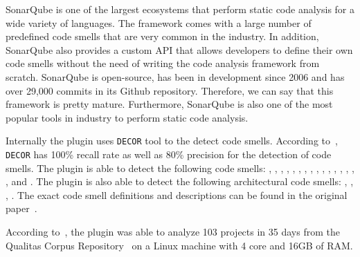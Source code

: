 SonarQube is one of the largest ecosystems that perform static code analysis for a wide variety of languages.
The framework comes with a large number of predefined code smells that are very common in the industry.
In addition, SonarQube also provides a custom API that allows developers to define their own code smells without
the need of writing the code analysis framework from scratch.
SonarQube is open-source, has been in development since 2006 and has over 29,000 commits in its Github repository\cite{sonar-repo}.
Therefore, we can say that this framework is pretty mature.
Furthermore, SonarQube is also one of the most popular tools in industry to perform static code analysis.

Internally the  plugin uses \texttt{DECOR} tool to the detect code smells.
According to~\citeauthor{sonar-plugin-external}, \texttt{DECOR} has 100\% recall rate as well as 80\% precision
for the detection of code smells.
The plugin is able to detect the following code smells: , ,
, , , ,
, , , ,
, , ,
, , ,  and
.
The plugin is also able to detect the following architectural code smells:
, , ,
.
The exact code smell definitions and descriptions can be found in the original paper~\cite{sonar-plugin-external}.

According to~\citeauthor{sonar-plugin-external}, the plugin was able to analyze 103 projects in 35 days
from the Qualitas Corpus Repository~\cite{qualitas-corpus} on a Linux machine with 4 core and 16GB of RAM\@.
